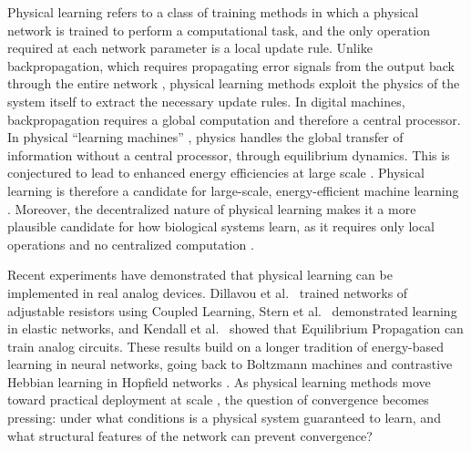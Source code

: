 \documentclass{siamart}
\begin{document}
Physical learning refers to a class of training methods in which a physical network is trained to perform a computational task, and the only operation required at each network parameter is a local update rule. Unlike backpropagation, which requires propagating error signals from the output back through the entire network \cite{scellier2017equilibrium, kendall2020training}, physical learning methods exploit the physics of the system itself to extract the necessary update rules. In digital machines, backpropagation requires a global computation and therefore a central processor. In physical ``learning machines'' \cite{stern2021learning}, physics handles the global transfer of information without a central processor, through equilibrium dynamics. This is conjectured to lead to enhanced energy efficiencies at large scale \cite{kendall2020training, markovic2020physics}. Physical learning is therefore a candidate for large-scale, energy-efficient machine learning \cite{markovic2020physics}. Moreover, the decentralized nature of physical learning makes it a more plausible candidate for how biological systems learn, as it requires only local operations and no centralized computation \cite{stern2023learning}.

Recent experiments have demonstrated that physical learning can be implemented in real analog devices. Dillavou et al.\ \cite{dillavou2022demonstration} trained networks of adjustable resistors using Coupled Learning, Stern et al.\ \cite{stern2020supervised} demonstrated learning in elastic networks, and Kendall et al.\ \cite{kendall2020training} showed that Equilibrium Propagation can train analog circuits. These results build on a longer tradition of energy-based learning in neural networks, going back to Boltzmann machines \cite{hinton2002training} and contrastive Hebbian learning in Hopfield networks \cite{movellan1991contrastive}. As physical learning methods move toward practical deployment at scale \cite{laborieux2021scaling}, the question of convergence becomes pressing: under what conditions is a physical system guaranteed to learn, and what structural features of the network can prevent convergence?
\end{document}

